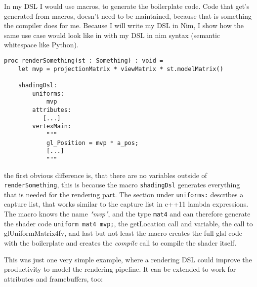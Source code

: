 \documentclass[10pt]{report}
\begin{document}
In my DSL I would use macros, to generate the boilerplate code. Code that get's generated from macros, doesn't need to be maintained, because that is something the compiler does for me. Because I will write my DSL in Nim, I show how the same use case would look like in with my DSL in nim syntax (semantic whitespace like Python).

\begin{verbatim}
proc renderSomething(st : Something) : void =
    let mvp = projectionMatrix * viewMatrix * st.modelMatrix()
    
    shadingDsl:
        uniforms:
            mvp
        attributes:
           [...]
        vertexMain:
            """
            gl_Position = mvp * a_pos;
            [...]
            """
\end{verbatim}

the first obvious difference is, that there are no variables outside of \texttt{ren\-der\-Some\-thing}, this is because the macro \texttt{shadingDsl} generates everything that is needed for the rendering part. The section under \texttt{uniforms:} describes a capture list, that works similar to the capture list in c++11 lambda expressions. The macro knows the name \textit{"mvp"}, and the type \texttt{mat4} and can therefore generate the shader code \texttt{uniform mat4 mvp;}, the getLocation call and variable, the call to glUniformMatrix4fv, and last but not least the macro creates the full glsl code with the boilerplate and creates the \textit{compile} call to compile the shader itself.

This was just one very simple example, where a rendering DSL could improve the productivity to model the rendering pipeline. It can be extended to work for attributes and framebuffers, too:
\end{document}
